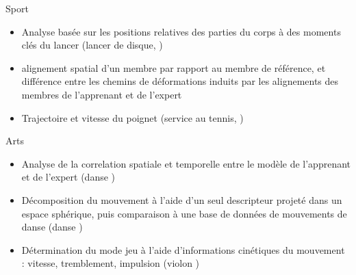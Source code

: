     \begin{frame}{\subsecname}
        \begin{block}{Sport}
            \begin{itemize}[label=$\bullet$]
                \item Analyse basée sur les positions relatives des parties du corps à des moments clés du lancer (lancer de disque, )
                \item alignement spatial d'un membre par rapport au membre de référence, et différence entre les chemins de déformations induits par les alignements des membres de l’apprenant et de l’expert 
                \item Trajectoire et vitesse du poignet (service au tennis, )
            \end{itemize}
        \end{block}
    \end{frame}
    
    \begin{frame}{\subsecname}
        \begin{block}{Arts}
            \begin{itemize}[label=$\bullet$]
                \item Analyse de la correlation spatiale et temporelle entre le modèle de l'apprenant et de l'expert (danse )           
                \item Décomposition du mouvement à l'aide d'un seul descripteur projeté dans un espace sphérique, puis comparaison à une base de données de mouvements de danse (danse )
                \item Détermination du mode jeu à l'aide d'informations cinétiques du mouvement : vitesse, tremblement, impulsion (violon )
            \end{itemize}
        \end{block}
    \end{frame}
    
